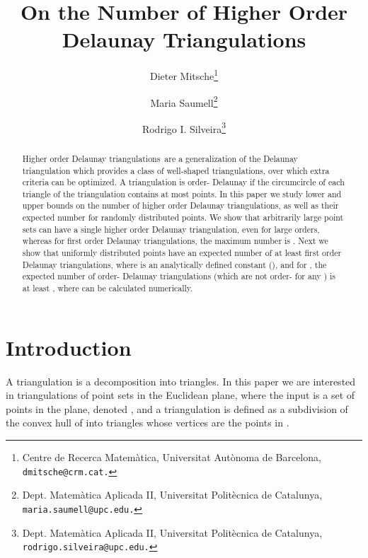 \documentclass {journal}
\newcommand {\hodt}{higher order Delaunay triangulation}
\newcommand {\hodts}{higher order Delaunay triangulations}
\newcommand {\Hodts}{Higher order Delaunay triangulations}
\newcommand {\fodts}{first order Delaunay triangulations}
\begin{document}
\title{On the Number of Higher Order Delaunay Triangulations}


\author{Dieter Mitsche\thanks{Centre de Recerca Matem\`{a}tica, Universitat Aut\`{o}noma de Barcelona,
  \tt{dmitsche@crm.cat}.}
\and
Maria Saumell\thanks{Dept. Matem\`{a}tica Aplicada II, Universitat Polit\`{e}cnica de Catalunya,
   \tt{maria.saumell@upc.edu}.}
\and
Rodrigo I. Silveira\thanks{Dept. Matem\`{a}tica Aplicada II, Universitat Polit\`{e}cnica de Catalunya,
   \tt{rodrigo.silveira@upc.edu}.}
}



\maketitle

\begin{abstract}
\Hodts\ are a generalization of the Delaunay triangulation which
provides a class of well-shaped triangulations, over which extra
criteria can be optimized. A triangulation is order- Delaunay
if the circumcircle of each triangle of the triangulation contains
at most  points. In this paper we study lower and upper bounds
on the number of \hodts,  as well as their expected number for
randomly distributed points. We show that arbitrarily large point
sets can have a single \hodt, even for large orders, whereas for
\fodts, the maximum number is . Next we show that
uniformly distributed points have an expected number of at least
  \fodts, where  is an analytically
defined constant (), and for , the
expected number of order- Delaunay triangulations (which are
not order- for any ) is at least ,
where  can be calculated numerically.
\end{abstract}

 \section{Introduction}

A triangulation is a decomposition into triangles. In this paper
we are interested in triangulations of point sets in the Euclidean
plane, where the input is a set of points in the plane, denoted
, and a triangulation is defined as a subdivision of the
convex hull of  into triangles whose vertices are the points
in .
\end{document}
